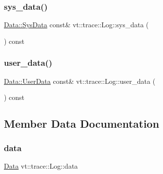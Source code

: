 \mbox{\label{structvt_1_1trace_1_1_log_a082937c397ac5b47ffc9089ff94698f0}} 
\subsubsection{\texorpdfstring{sys\+\_\+data()}{sys\_data()}}
{\footnotesize\ttfamily \hyperlink{structvt_1_1trace_1_1_log_1_1_data_1_1_sys_data}{Data\+::\+Sys\+Data} const\& vt\+::trace\+::\+Log\+::sys\+\_\+data (\begin{DoxyParamCaption}{ }\end{DoxyParamCaption}) const\hspace{0.3cm}{\ttfamily [inline]}}

\mbox{\label{structvt_1_1trace_1_1_log_a7b251bc7dcebcbbafa29cc2ca6ea4c12}} 
\subsubsection{\texorpdfstring{user\+\_\+data()}{user\_data()}}
{\footnotesize\ttfamily \hyperlink{structvt_1_1trace_1_1_log_1_1_data_1_1_user_data}{Data\+::\+User\+Data} const\& vt\+::trace\+::\+Log\+::user\+\_\+data (\begin{DoxyParamCaption}{ }\end{DoxyParamCaption}) const\hspace{0.3cm}{\ttfamily [inline]}}



\subsection{Member Data Documentation}
\mbox{\label{structvt_1_1trace_1_1_log_ac79b001b6167a37e337bc9d704af8535}} 
\subsubsection{\texorpdfstring{data}{data}}
{\footnotesize\ttfamily \hyperlink{unionvt_1_1trace_1_1_log_1_1_data}{Data} vt\+::trace\+::\+Log\+::data\hspace{0.3cm}{\ttfamily [private]}}

